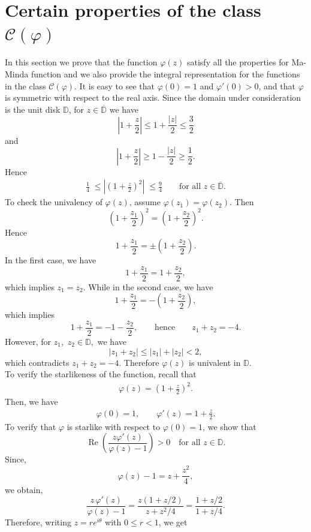 \documentclass[a4paper,12pt,reqno]{amsart} %
\numberwithin{equation}{section}
\theoremstyle{definition}
\begin{document}
\section{Certain properties of the class $\mathcal{C}(\varphi)$}
In this section we prove that the function $\varphi(z)$
satisfy all the properties for Ma-Minda function and we also provide the integral representation for the functions in the class $\mathcal{C}(\varphi).$ It is easy to see that $\varphi(0)=1$ and $\varphi'(0)>0$, and that $\varphi$ is symmetric with respect to the real axis. Since the domain under consideration is the unit disk $\mathbb{D}$, for $z\in \overline{\mathbb{D}}$ we have
\[
\left|1+\frac{z}{2}\right|\le 1+\frac{|z|}{2}\le \frac{3}{2}
\]
and
\[
\left|1+\frac{z}{2}\right|\ge 1-\frac{|z|}{2}\ge \frac{1}{2}.
\]
Hence
\begin{align}\label{eq:2.1}
\frac{1}{4} \;\le \left|\left(1+\frac{z}{2}\right)^{2}\right| \;\le \frac{9}{4}
\qquad  \text{for all } z \in \overline{\mathbb{D}}.
\end{align}
To check the univalency of $\varphi(z)$, assume \( \varphi(z_1) = \varphi(z_2) \). Then
\[
\left(1 + \frac{z_1}{2} \right)^2 = \left(1 + \frac{z_2}{2} \right)^2.
\]
Hence
\[
1 + \frac{z_1}{2} = \pm \left(1 + \frac{z_2}{2} \right).
\]
In the first case, we have
\[
1 + \frac{z_1}{2} = 1 + \frac{z_2}{2},
\]
which implies $z_{1}=z_{2}.$
While in the second case, we have
\[
1 + \frac{z_1}{2} = -\left(1 + \frac{z_2}{2} \right),
\]
which implies
\[
1 + \frac{z_1}{2} = -1 - \frac{z_2}{2},
\qquad\text{hence}\qquad
z_1 + z_2 = -4.
\]
However, for $z_1,$ $z_2\in \mathbb{D},$ we have
\[
|z_1 + z_2| \leq |z_1| + |z_2| < 2,
\]
which contradicts \( z_1 + z_2 = -4 \). Therefore \( \varphi(z) \) is univalent in  $\mathbb{D}$.\\[2mm]
To verify the starlikeness of the function, recall that
\begin{align*}
\varphi(z) = \left(1 + \frac{z}{2} \right)^2.
\end{align*}
Then, we have
\begin{align*}
\varphi(0) = 1,
\qquad
\varphi'(z) = 1 + \frac{z}{2}.
\end{align*}
To verify that \( \varphi \) is starlike with respect to \( \varphi(0) = 1 \), we show that
\[
\operatorname{Re}\!\left( \frac{z \varphi'(z)}{\varphi(z) - 1} \right) > 0 
\quad \text{for all } z \in \mathbb{D}.
\]
Since,
\[
\varphi(z)-1 = z + \frac{z^2}{4},
\]
we obtain, 
\[
\frac{z\,\varphi'(z)}{\varphi(z)-1}
=
\frac{z(1+z/2)}{z+z^{2}/4}
=
\frac{1+z/2}{1+z/4}.
\]
Therefore, writing $z=re^{i\theta}$ with $0\le r<1$, we get
\end{document}
